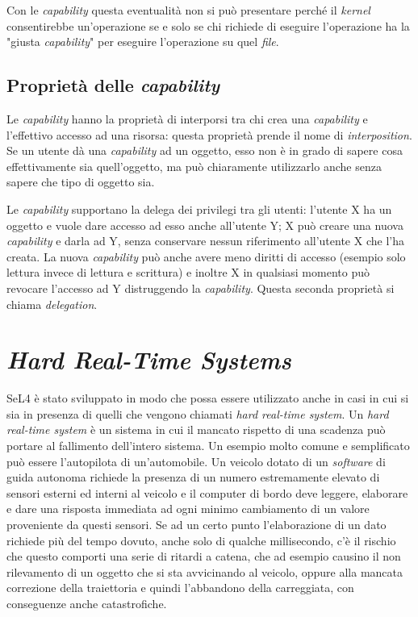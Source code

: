Con le \textit{capability} questa eventualità non si può presentare perché il \textit{kernel} consentirebbe un'operazione se e solo se chi richiede di eseguire l'operazione ha la "giusta \textit{capability}" per eseguire l'operazione su quel \textit{file}. 

\subsection{Proprietà delle \textit{capability}}
Le \textit{capability} hanno la proprietà di interporsi tra chi crea una \textit{capability} e l'effettivo accesso ad una risorsa: questa proprietà prende il nome di \textit{interposition}. Se un utente dà una \textit{capability} ad un oggetto, esso non è in grado di sapere cosa effettivamente sia quell'oggetto, ma può chiaramente utilizzarlo anche senza sapere che tipo di oggetto sia.

Le \textit{capability} supportano la delega dei privilegi tra gli utenti: l'utente X ha un oggetto e vuole dare accesso ad esso anche all'utente Y; X può creare una nuova \textit{capability} e darla ad Y, senza conservare nessun riferimento all'utente X che l'ha creata. La nuova \textit{capability} può anche avere meno diritti di accesso (esempio solo lettura invece di lettura e scrittura) e inoltre X in qualsiasi momento può revocare l'accesso ad Y distruggendo la \textit{capability}. Questa seconda proprietà si chiama \textit{delegation}.

\section{\textit{\uppercase{H}ard \uppercase{R}eal-\uppercase{T}ime \uppercase{S}ystems}}
SeL4 è stato sviluppato in modo che possa essere utilizzato anche in casi in cui si sia in presenza di quelli che vengono chiamati \textit{hard real-time system}.
Un \textit{hard real-time system} è un sistema in cui il mancato rispetto di una scadenza può portare al fallimento dell'intero sistema. Un esempio molto comune e semplificato può essere l'autopilota di un'automobile. Un veicolo dotato di un \textit{software} di guida autonoma richiede la presenza di un numero estremamente elevato di sensori esterni ed interni al veicolo e il computer di bordo deve leggere, elaborare e dare una risposta immediata ad ogni minimo cambiamento di un valore proveniente da questi sensori. Se ad un certo punto l'elaborazione di un dato richiede più del tempo dovuto, anche solo di qualche millisecondo, c'è il rischio che questo comporti una serie  di ritardi a catena, che ad esempio causino il non rilevamento di un oggetto che si sta avvicinando al veicolo, oppure alla mancata correzione della traiettoria e quindi l'abbandono della carreggiata, con conseguenze anche catastrofiche.

